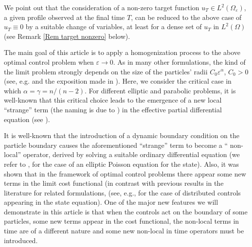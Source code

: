 \documentclass[10pt,a4paper]{amsart}
\numberwithin{equation}{section}
\begin{document}
We point out that the consideration of a non-zero target function
$u_{T}\in L^2(\Omega _{\varepsilon })$, a given profile observed at the final time
$T $, can be reduced to the above case of $u_{T}\equiv 0$ by a suitable
change of variables, at least for a dense set of $u_{T}$ in $L^2(\Omega )$
(see Remark \ref{Rem target nonzero} below).

The main goal of this article is to apply a homogenization process to the
above optimal control problem when $\varepsilon \to 0$. As in many
other formulations, the kind of the limit problem strongly depends on the
size of the particles' radii $C_0\varepsilon ^{\alpha }$, $C_0>0$
(see, e.g. \cite{ Anguiano,Timof} and the exposition made in
\cite{DiGoShBook}). Here, we consider the critical case in which
$\alpha =\gamma ={n}/{(n-2)}$. For different elliptic and parabolic problems,
it is well-known that this critical choice leads to the emergence of a new local
``strange''  term (the naming is due to \cite{Cioranescu1997AST}) in the effective
partial differential equation
(see \cite{ Cioranescu1997AST, DiGoShBook,  Hurlov, Kaizu1,ZuShDiffEq}).

It is well-known that the introduction of a dynamic boundary condition on
the particle boundary causes the aforementioned ``strange''  term  to become a ``
non-local''  operator, derived by solving a suitable
ordinary differential equation (we refer to
\cite{ShDyn19, DiShZarbitrary}, for the case of an elliptic Poisson equation
for the state).
Also, it was shown that in the framework of optimal control problems
there appear some new terms in the limit cost functional (in contrast with
previous results in the literature for related formulations, (see, e.g.,
\cite{DShPo-first control,  DiPoSh control arbt size, DiPoShBound22,
DiPoShAttouch,  PoShControl20, SJPZ02, ZuShDynDok19,  Shaposhnikova2022HomogenizationOT}
for the case of distributed controls appearing in the state equation).
One of the major new features we will demonstrate in this article
is that when the controls act on the boundary of some particles, some new
terms appear in the cost functional, the non-local terms in time are of a
different nature and some new non-local in time operators must be introduced.
\end{document}
